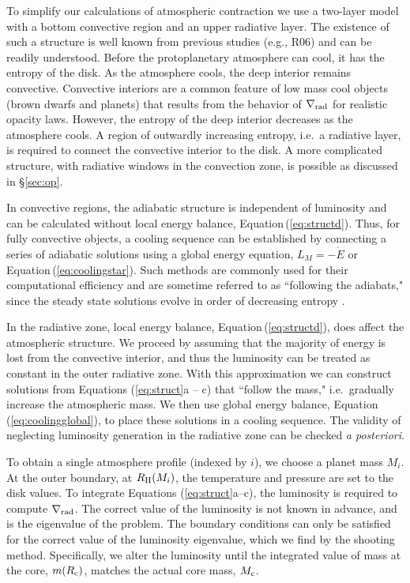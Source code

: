 \documentclass[apj, numberedappendix]{emulateapj}
\newcommand{\Eq}[1]{Equation\,(\ref{#1})}
\newcommand{\delrad}{\nabla_{\rm rad}}
\newcommand{\RH}{R_{\rm H}}
\newcommand{\co}{_{\rm c}}
\begin{document}
To simplify our calculations of atmospheric contraction we use a two-layer model with a bottom convective region and an upper radiative layer.   The existence of such a structure is well known from previous studies (e.g., R06) and can be readily understood.  Before the protoplanetary atmosphere can cool, it has the entropy of the disk.  As the atmosphere cools, the deep interior remains convective.  Convective interiors are a common feature of low mass cool objects (brown dwarfs and planets) that results from the behavior of $\delrad$ for realistic opacity laws.  However, the entropy of the deep interior decreases as the atmosphere cools.  A region of outwardly increasing entropy, i.e.\ a radiative layer, is required to connect the convective interior to the disk.  A more complicated structure, with radiative windows in the convection zone, is possible as discussed in \S\ref{sec:op}. 

In convective regions, the adiabatic structure is independent of luminosity and can be calculated without local energy balance, \Eq{eq:structd}.  Thus, for fully convective objects, a cooling sequence can be established by connecting a series of adiabatic solutions using a global energy equation, $L_M = -\dot{E}$ or \Eq{eq:coolingstar}.  Such methods are commonly used for their computational efficiency and are sometime referred to as ``following the adiabats," since the steady state solutions evolve in order of decreasing entropy \citep{marleau13}.

In the radiative zone,  local energy balance, \Eq{eq:structd}, does affect the atmospheric structure.  We proceed by assuming that the majority of energy is lost from the convective interior, and thus the luminosity can be treated as constant in the outer radiative zone.  With this approximation we can construct solutions from Equations (\ref{eq:struct}a -- c) that ``follow the mass," i.e.\ gradually increase the atmospheric mass.  We then use global energy balance, \Eq{eq:coolingglobal}, to place these solutions in a cooling sequence.  The validity of neglecting luminosity generation in the radiative zone can be checked \emph{a posteriori}.

To obtain a single atmosphere profile (indexed by $i$), we choose a planet mass $M_i$.  At the outer boundary, at $\RH(M_i)$, the temperature and pressure are set to the disk values.  To integrate Equations (\ref{eq:struct}a--c), the luminosity is required to compute $\delrad$.  The correct value of the luminosity is not known in advance, and is the eigenvalue of the problem.  The boundary conditions can only be satisfied for the correct value of the luminosity eigenvalue, which we find by the shooting method.  Specifically, we alter the luminosity until the integrated value of mass at the core, $m(R\co)$, matches the actual core mass, $M\co$.
\end{document}
